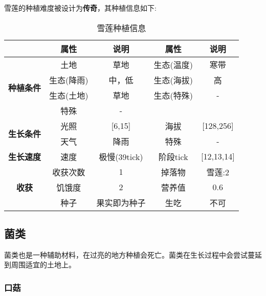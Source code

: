 雪莲的种植难度被设计为\textbf{传奇}，其种植信息如下:

\begin{table}[H]
    \centering
    \caption{雪莲种植信息}
    \label{table:雪莲种植信息}
    \setlength{\tabcolsep}{4mm}
    \begin{tabular}{c|cc|cc}
        \toprule
                                           & \textbf{属性} & \textbf{说明} & \textbf{属性} & \textbf{说明} \\
        \midrule
        \multirow{4}{*}{\textbf{种植条件}} & 土地          & 草地          & 生态(温度)    & 寒带    \\
                                           & 生态(降雨)    & 中，低        & 生态(海拔)    & 高      \\
                                           & 生态(土地)    & 草地          & 生态(特殊)    & -         \\
                                           & 特殊          & -                \\
        \midrule
        \multirow{2}{*}{\textbf{生长条件}} & 光照          & [6,15]        & 海拔          & [128,256]      \\
                                           & 天气          & 降雨            & 特殊          & -             \\
        \midrule
        \textbf{生长速度}                  & 速度          & 极慢(39tick)     & 阶段tick      & [12,13,14]       \\
        \midrule
        \multirow{3}{*}{\textbf{收获}}     & 收获次数      & 1             & 掉落物        & 雪莲:2      \\
                                           & 饥饿度        & 2             & 营养值        & 0.6           \\
                                           & 种子          & 果实即为种子  & 生吃          & 不可 \\
        \bottomrule
    \end{tabular}
\end{table}

\subsection{菌类}

菌类也是一种辅助材料，在过亮的地方种植会死亡。菌类在生长过程中会尝试蔓延到周围适宜的土地上。

\subsubsection{口菇}

